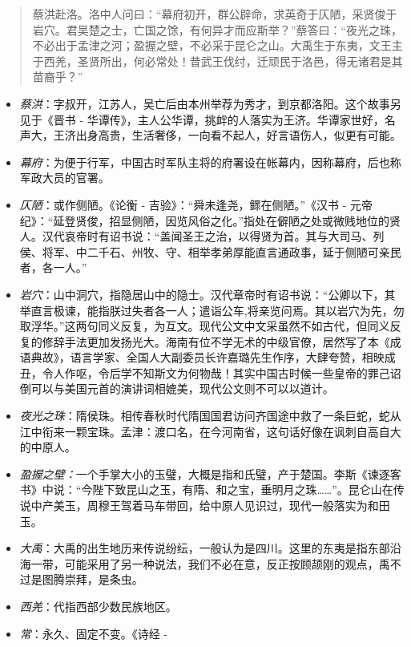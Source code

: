 \documentclass[]{book}
\providecommand{\tightlist}{%
  \setlength{\itemsep}{0pt}\setlength{\parskip}{0pt}}
\begin{document}
\begin{quote}
蔡洪赴洛。洛中人问曰：``幕府初开，群公辟命，求英奇于仄陋，采贤俊于岩穴。君吴楚之士，亡国之馀，有何异才而应斯举？''蔡答曰：``夜光之珠，不必出于孟津之河；盈握之壁，不必采于昆仑之山。大禹生于东夷，文王主于西羌，圣贤所出，何必常处！昔武王伐纣，迁顽民于洛邑，得无诸君是其苗裔乎？''
\end{quote}

\begin{itemize}
\tightlist
\item
  \emph{蔡洪}：字叔开，江苏人，吴亡后由本州举荐为秀才，到京都洛阳。这个故事另见于《晋书
  -
  华谭传》，主人公华谭，挑衅的人落实为王济。华谭家世好，名声大，王济出身高贵，生活奢侈，一向看不起人，好言语伤人，似更有可能。
\item
  \emph{幕府}：为便于行军，中国古时军队主将的府署设在帐幕内，因称幕府，后也称军政大员的官署。
\item
  \emph{仄陋}：或作侧陋。《论衡 - 吉验》：``舜未逢尧，鳏在侧陋。''《汉书
  -
  元帝纪》：``延登贤俊，招显侧陋，因览风俗之化。''指处在僻陋之处或微贱地位的贤人。汉代哀帝时有诏书说：``盖闻圣王之治，以得贤为首。其与大司马、列侯、将军、中二千石、州牧、守、相举孝弟厚能直言通政事，延于侧陋可亲民者，各一人。''
\item
  \emph{岩穴}：山中洞穴，指隐居山中的隐士。汉代章帝时有诏书说：``公卿以下，其举直言极谏，能指朕过失者各一人；遣诣公车,将亲览问焉。其以岩穴为先，勿取浮华。''这两句同义反复，为互文。现代公文中文采虽然不如古代，但同义反复的修辞手法更加发扬光大。海南有位不学无术的中级官僚，居然写了本《成语典故》，语言学家、全国人大副委员长许嘉璐先生作序，大肆夸赞，相映成丑，令人作呕，令后学不知斯文为何物哉！其实中国古时候一些皇帝的罪己诏倒可以与美国元首的演讲词相媲美，现代公文则不可以以道计。
\item
  \emph{夜光之珠}：隋侯珠。相传春秋时代隋国国君访问齐国途中救了一条巨蛇，蛇从江中衔来一颗宝珠。孟津：渡口名，在今河南省，这句话好像在讽刺自高自大的中原人。
\item
  \emph{盈握之壁：}一个手掌大小的玉璧，大概是指和氏璧，产于楚国。李斯《谏逐客书》中说：``今陛下致昆山之玉，有隋、和之宝，垂明月之珠\ldots{}\ldots{}''。昆仑山在传说中产美玉，周穆王驾着马车带回，给中原人见识过，现代一般落实为和田玉。
\item
  \emph{大禹}：大禹的出生地历来传说纷纭，一般认为是四川。这里的东夷是指东部沿海一带，可能采用了另一种说法，我们不必在意，反正按顾颉刚的观点，禹不过是图腾崇拜，是条虫。
\item
  \emph{西羌}：代指西部少数民族地区。
\item
  \emph{常}：永久、固定不变。《诗经 -

\end{itemize}
\end{document}
